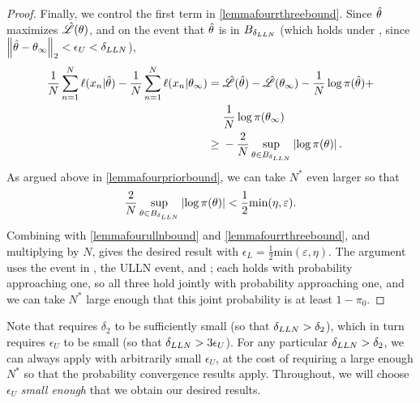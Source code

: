 \begin{lem}
\begin{proof}
Finally, we control the first term
in \eqref{lemmafourrthreebound}.  Since $\hat\theta$ maximizes
$\hat{\mathscr{L}}(\theta)$, and on the event that $\hat\theta$ is in
$B_{\delta_{LLN}}$ (which holds under , since
$\left\Vert \hat\theta - \theta_{\infty}\right\Vert_2 < \epsilon_U < \delta_{LLN}$),
$$
\begin{aligned}
\frac{1}{N} \sum_{n=1}^N \ell(x_n \vert \hat\theta) -
       \frac{1}{N} \sum_{n=1}^N \ell(x_n \vert \theta_{\infty}) ={}&
\hat{\mathscr{L}}(\hat\theta) - \hat{\mathscr{L}}(\theta_{\infty}) - \frac{1}{N} \log \pi(\hat\theta) +
\\{}&
\frac{1}{N} \log \pi(\theta_{\infty})
\\\ge{}&
-\frac{2}{N}  \sup_{\theta \in B_{\delta_{LLN}}} \left\vert \log \pi(\theta)\right\vert.
\end{aligned}
$$
As argued above in \eqref{lemmafourpriorbound}, we can take
$N^*$ even larger so that
$$
\frac{2}{N} \sup_{\theta \in B_{\delta_{LLN}}} \left\vert 
    \log \pi(\theta)
\right\vert < \frac{1}{2} \textrm{min}(\eta, \varepsilon).
$$
Combining with \eqref{lemmafourullnbound} and \eqref{lemmafourrthreebound},
and multiplying by $N$, gives the desired result with
$\epsilon_L = \frac{1}{2} \textrm{min}(\varepsilon, \eta)$.  The argument
uses the event in  , the ULLN event, and
; each holds with probability approaching one, so all
three hold jointly with probability approaching one, and we can take $N^*$
large enough that this joint probability is at least $1 - \pi_0$.



\end{proof}
%
\end{lem}

Note that  requires $\delta_2$ to be sufficiently small (so that
$\delta_{LLN} > \delta_2$), which in turn requires $\epsilon_U$ to be small (so
that $\delta_{LLN} > 3 \epsilon_U$).  For any particular $\delta_{LLN} > \delta_2$,
we can always apply  with arbitrarily small $\epsilon_U$, at the
cost of requiring a large enough $N^*$ so that the probability convergence
results apply.
%
Throughout, we will choose $\epsilon_U$ \textit{small enough} that we obtain our
desired results.
